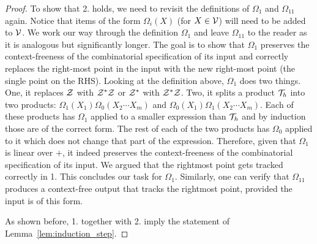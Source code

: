 \documentclass[12pt, a4paper, twoside]{report}
\begin{document}
\begin{proof}
To show that 2. holds, we need to revisit the definitions of $\Omega_1$ and $\Omega_{11}$ again. Notice that items of the form $\Omega_i(X)$ (for $X\in \mathcal{V}$) will need to be added to $\mathcal{V}$. We work our way through the definition $\Omega_1$ and leave $\Omega_{11}$ to the reader as it is analogous but significantly longer. The goal is to show that $\Omega_1$ preserves the context-freeness of the combinatorial specification of its input and correctly replaces the right-most point in the input with the new right-most point (the single point on the RHS). Looking at the definition above, $\Omega_1$ does two things. One, it replaces $\mathcal{Z}$ with $\mathcal{Z}^*\mathcal{Z}$ or $\mathcal{Z}^*$ with $\mathcal{Z}^*\mathcal{Z}$. Two, it splits a product $\mathcal{T}_h$ into two products: $\Omega_1(X_1)\Omega_0(X_2\cdots X_m)$ and $\Omega_0(X_1)\Omega_1(X_2\cdots X_m)$. Each of these products has $\Omega_1$ applied to a smaller expression than $\mathcal{T}_h$ and by induction those are of the correct form. The rest of each of the two products has $\Omega_0$ applied to it which does not change that part of the expression. Therefore, given that $\Omega_1$ is linear over $+$, it indeed preserves the context-freeness of the combinatorial specification of its input. We argued that the rightmost point gets tracked correctly in 1. This concludes our task for $\Omega_1$. Similarly, one can verify that $\Omega_{11}$ produces a context-free output that tracks the rightmost point, provided the input is of this form.

As shown before, 1. together with 2. imply the statement of Lemma~\ref{lem:induction_step}. 
\end{proof}
\end{document}
